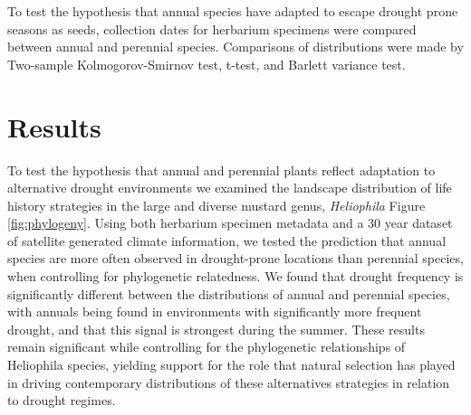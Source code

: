 \documentclass[man,floatsintext]{apa6}
\theoremstyle{definition}
\theoremstyle{definition}
\theoremstyle{definition}
\theoremstyle{remark}
\begin{document}
To test the hypothesis that annual species have adapted to escape
drought prone seasons as seeds, collection dates for herbarium specimens
were compared between annual and perennial species. Comparisons of
distributions were made by Two-sample Kolmogorov-Smirnov test, t-test,
and Barlett variance test.

\hypertarget{results}{%
\section{Results}\label{results}}

To test the hypothesis that annual and perennial plants reflect
adaptation to alternative drought environments we examined the landscape
distribution of life history strategies in the large and diverse mustard
genus, \emph{Heliophila} Figure \ref{fig:phylogeny}. Using both
herbarium specimen metadata and a 30 year dataset of satellite generated
climate information, we tested the prediction that annual species are
more often observed in drought-prone locations than perennial species,
when controlling for phylogenetic relatedness. We found that drought
frequency is significantly different between the distributions of annual
and perennial species, with annuals being found in environments with
significantly more frequent drought, and that this signal is strongest
during the summer. These results remain significant while controlling
for the phylogenetic relationships of Heliophila species, yielding
support for the role that natural selection has played in driving
contemporary distributions of these alternatives strategies in relation
to drought regimes.
\end{document}
